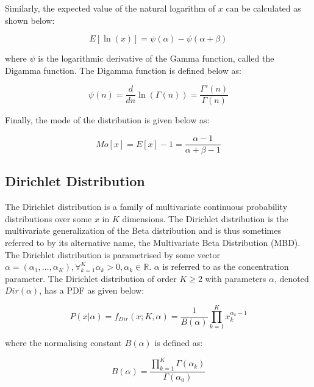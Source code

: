 Similarly, the expected value of the natural logarithm of $x$ can be calculated as shown below:

\begin{equation}
E[\ln(x)] = \psi({\alpha}) - \psi(\alpha + \beta)
\end{equation}

where $\psi$ is the logarithmic derivative of the Gamma function, called the Digamma function. The Digamma function is defined below as:

\begin{equation}
\psi(n) = \frac{d}{dn}\ln(\Gamma(n)) = \frac{\Gamma'(n)}{\Gamma(n)}
\end{equation}

Finally, the mode of the distribution is given below as:

\begin{equation}
Mo[x] = E[x] - 1 = \frac{\alpha - 1}{\alpha + \beta - 1}
\end{equation}










\subsection{Dirichlet Distribution}
\label{sec:probability:probability_distributions:dirichlet}


The Dirichlet distribution is a family of multivariate continuous probability distributions over some $x$ in $K$ dimensions. The Dirichlet distribution is the multivariate generalization of the Beta distribution and is thus sometimes referred to by its alternative name, the Multivariate Beta Distribution (MBD). The Dirichlet distribution is parametrised by some vector $\alpha = (\alpha_{1}, \dots, \alpha_{K}), \forall_{k=1}^{K} \alpha_{k} > 0, \alpha_{k} \in \mathbb{R}$. $\alpha$ is referred to as the  concentration parameter. The Dirichlet distribution of order $K \geq 2$ with parameters $\alpha$, denoted $Dir(\alpha)$, has a PDF as given below:

\begin{equation}
P(x | \alpha) =  f_{Dir}(x; K, \alpha) = \frac{1}{B(\alpha)}  \prod_{k=1}^{K} x_{k}^{\alpha_{k} - 1}
\end{equation}

where the normalising constant $B(\alpha)$ is defined as:

\begin{equation}
B(\alpha) = \frac{\prod_{k=1}^{K} \Gamma(\alpha_{k})}{\Gamma(\alpha_{0})}
\end{equation}

